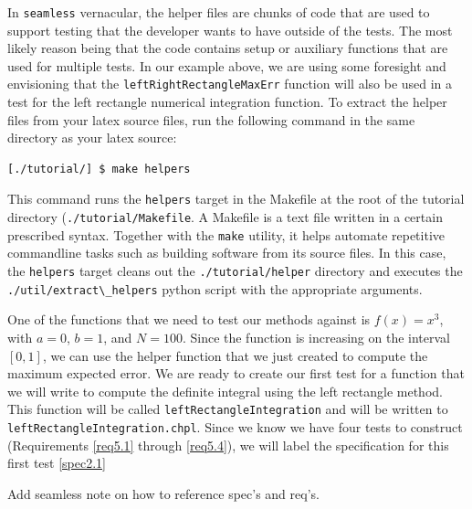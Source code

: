 \begin{seamlessnote}
In \lstinline{seamless} vernacular, the helper files are chunks of code that are used to support
testing that the developer wants to have outside of the tests. The most likely reason being that
the code contains setup or auxiliary functions that are used for multiple tests. In our example
above, we are using some foresight and envisioning that the \lstinline{leftRightRectangleMaxErr}
function will also be used in a test for the left rectangle numerical integration function. To 
extract the helper files from your latex source files, run the following command in the same
directory as your latex source:
\begin{verbatim}
[./tutorial/] $ make helpers
\end{verbatim}
This command runs the \lstinline{helpers} target in the Makefile at the root of the 
tutorial directory (\lstinline{./tutorial/Makefile}. A Makefile is a text 
file written in a certain prescribed syntax. Together with the \lstinline{make} utility, it 
helps automate repetitive commandline tasks such as building software from its source files. 
In this case, the \lstinline{helpers} target cleans out the \lstinline{./tutorial/helper} directory and
executes the \lstinline{./util/extract\_helpers} python script with the appropriate arguments.
\end{seamlessnote}

One of the functions that we need to test our methods against is $f(x) = x^3$, 
with $a=0$, $b=1$, and $N=100$.
Since the function is increasing on the interval $[0,1]$, we can use 
the helper function that we just created to compute the maximum expected error. We are
ready to create our first test for a function that we will write to compute the definite
integral using the left rectangle method. This function will be called 
\lstinline{leftRectangleIntegration}
and will be written to \lstinline{leftRectangleIntegration.chpl}.
Since we know we have four tests to construct (Requirements \ref{req5.1} through \ref{req5.4}),
we will label the specification for this first test \ref{spec2.1}
\begin{TODO}
  Add seamless note on how to reference spec's and req's.
\end{TODO}

